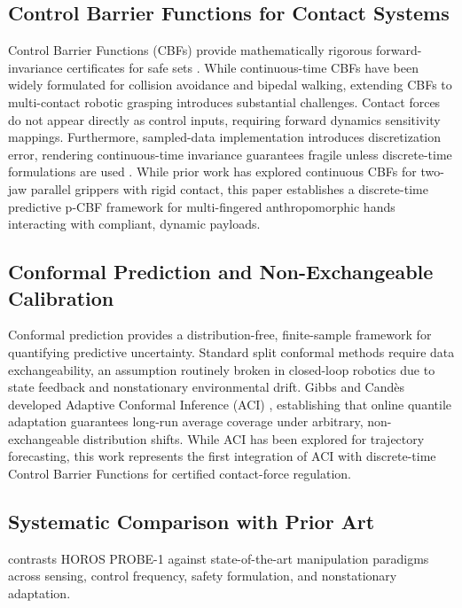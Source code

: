 \subsection{Control Barrier Functions for Contact Systems}
Control Barrier Functions (CBFs) provide mathematically rigorous forward-invariance certificates for safe sets \cite{ames2016control}. While continuous-time CBFs have been widely formulated for collision avoidance and bipedal walking, extending CBFs to multi-contact robotic grasping introduces substantial challenges. Contact forces do not appear directly as control inputs, requiring forward dynamics sensitivity mappings. Furthermore, sampled-data implementation introduces discretization error, rendering continuous-time invariance guarantees fragile unless discrete-time formulations are used \cite{agrawal2017discrete}. While prior work has explored continuous CBFs for two-jaw parallel grippers with rigid contact, this paper establishes a discrete-time predictive p-CBF framework for multi-fingered anthropomorphic hands interacting with compliant, dynamic payloads.

\subsection{Conformal Prediction and Non-Exchangeable Calibration}
Conformal prediction provides a distribution-free, finite-sample framework for quantifying predictive uncertainty. Standard split conformal methods require data exchangeability, an assumption routinely broken in closed-loop robotics due to state feedback and nonstationary environmental drift. Gibbs and Cand{\`e}s developed Adaptive Conformal Inference (ACI) \cite{gibbs2021adaptive,gibbs2024conformal}, establishing that online quantile adaptation guarantees long-run average coverage under arbitrary, non-exchangeable distribution shifts. While ACI has been explored for trajectory forecasting, this work represents the first integration of ACI with discrete-time Control Barrier Functions for certified contact-force regulation.

\subsection{Systematic Comparison with Prior Art}
 contrasts HOROS PROBE-1 against state-of-the-art manipulation paradigms across sensing, control frequency, safety formulation, and nonstationary adaptation.

